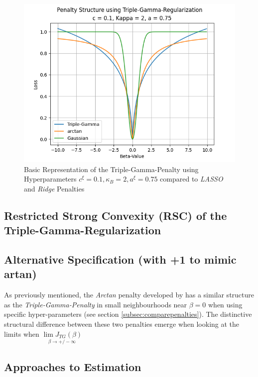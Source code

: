 \documentclass[12pt,a4paper]{article}
\begin{document}
\begin{figure}[!h]
\centering
\includegraphics[scale=0.75]{../02_simulation/021_simulation_figures/simpleTGpenalty.png}
\caption{Basic Representation of the Triple-Gamma-Penalty using Hyperparameters $c^\xi = 0.1, \kappa_B = 2, a^\xi = 0.75$ compared to \textit{LASSO} and \textit{Ridge} Penalties}
\label{fig:basicTGPen}
\end{figure}

\subsection{Restricted Strong Convexity (RSC) of the Triple-Gamma-Regularization}

\subsection{Alternative Specification (with +1 to mimic artan)}

As previously mentioned, the \textit{Arctan} penalty developed by \textcite{WangZhu2016} has a similar structure as the \textit{Triple-Gamma-Penalty} in small neighbourhoods near $\beta = 0$ when using specific hyper-parameters (see section \ref{subsec:comparepenalties}). The distinctive structural difference between these two penalties emerge when looking at the limits when  $\underset{\beta \to +/- \infty}{\lim J_{TG}(\beta)}$

\subsection{Approaches to Estimation}
\end{document}
